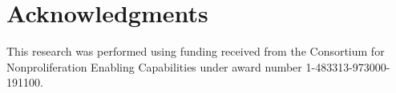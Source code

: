 \documentclass{anstrans}
\begin{document}
\section{Acknowledgments}
This research was performed using funding received from the Consortium for Nonproliferation Enabling Capabilities under award number 1-483313-973000-191100.



\end{document}
